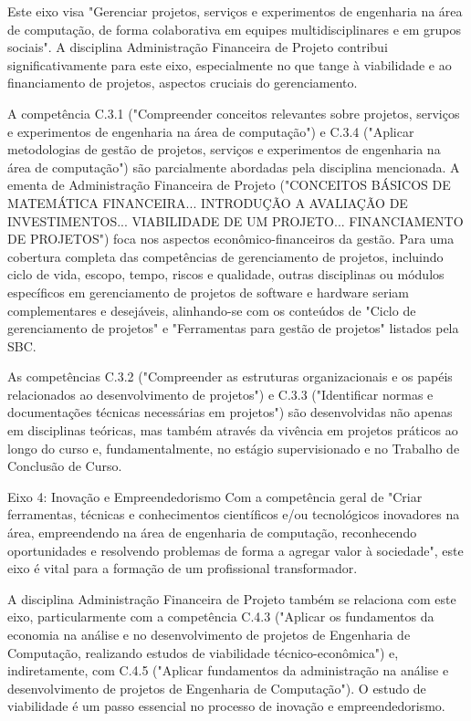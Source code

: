 Este eixo visa "Gerenciar projetos, serviços e experimentos de engenharia na área de computação, de forma colaborativa em equipes multidisciplinares e em grupos sociais". A disciplina Administração Financeira de Projeto contribui significativamente para este eixo, especialmente no que tange à viabilidade e ao financiamento de projetos, aspectos cruciais do gerenciamento.

A competência C.3.1 ("Compreender conceitos relevantes sobre projetos, serviços e experimentos de engenharia na área de computação") e C.3.4 ("Aplicar metodologias de gestão de projetos, serviços e experimentos de engenharia na área de computação") são parcialmente abordadas pela disciplina mencionada. A ementa de Administração Financeira de Projeto ("CONCEITOS BÁSICOS DE MATEMÁTICA FINANCEIRA... INTRODUÇÃO A AVALIAÇÃO DE INVESTIMENTOS... VIABILIDADE DE UM PROJETO... FINANCIAMENTO DE PROJETOS") foca nos aspectos econômico-financeiros da gestão. Para uma cobertura completa das competências de gerenciamento de projetos, incluindo ciclo de vida, escopo, tempo, riscos e qualidade, outras disciplinas ou módulos específicos em gerenciamento de projetos de software e hardware seriam complementares e desejáveis, alinhando-se com os conteúdos de "Ciclo de gerenciamento de projetos" e "Ferramentas para gestão de projetos" listados pela SBC.

As competências C.3.2 ("Compreender as estruturas organizacionais e os papéis relacionados ao desenvolvimento de projetos") e C.3.3 ("Identificar normas e documentações técnicas necessárias em projetos") são desenvolvidas não apenas em disciplinas teóricas, mas também através da vivência em projetos práticos ao longo do curso e, fundamentalmente, no estágio supervisionado e no Trabalho de Conclusão de Curso.

Eixo 4: Inovação e Empreendedorismo
Com a competência geral de "Criar ferramentas, técnicas e conhecimentos científicos e/ou tecnológicos inovadores na área, empreendendo na área de engenharia de computação, reconhecendo oportunidades e resolvendo problemas de forma a agregar valor à sociedade", este eixo é vital para a formação de um profissional transformador.

A disciplina Administração Financeira de Projeto também se relaciona com este eixo, particularmente com a competência C.4.3 ("Aplicar os fundamentos da economia na análise e no desenvolvimento de projetos de Engenharia de Computação, realizando estudos de viabilidade técnico-econômica") e, indiretamente, com C.4.5 ("Aplicar fundamentos da administração na análise e desenvolvimento de projetos de Engenharia de Computação"). O estudo de viabilidade é um passo essencial no processo de inovação e empreendedorismo.

